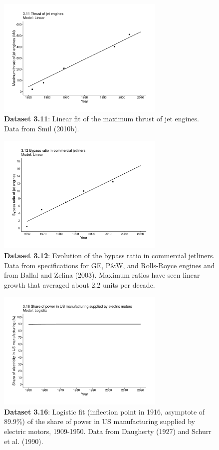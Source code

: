 \documentclass[aps,rmp,preprint,superscriptaddress,10pt,onecolumn]{article}
\begin{document}
\begin{figure}[h]
\includegraphics[width=8cm]{output/figs-ggplot/3.11.pdf}
\caption{\textbf{Dataset 3.11}: Linear fit of the maximum thrust of jet engines. Data from Smil (2010b).}
\end{figure}
	
\begin{figure}[h]
\includegraphics[width=8cm]{output/figs-ggplot/3.12.pdf}
\caption{\textbf{Dataset 3.12}: Evolution of the bypass ratio in commercial jetliners. Data from specifications for GE, P\&W, and Rolls-Royce engines and from Ballal and Zelina (2003). Maximum ratios have seen linear growth that averaged about 2.2 units per decade.}
\end{figure}
	
\begin{figure}[h]
\includegraphics[width=8cm]{output/figs-ggplot/3.16.pdf}
\caption{\textbf{Dataset 3.16}: Logistic fit (inflection point in 1916, asymptote of 89.9\%) of the share of power in US manufacturing supplied by electric motors, 1909-1950. Data from Daugherty (1927) and Schurr et al. (1990).}
\end{figure}
	
\end{document}
